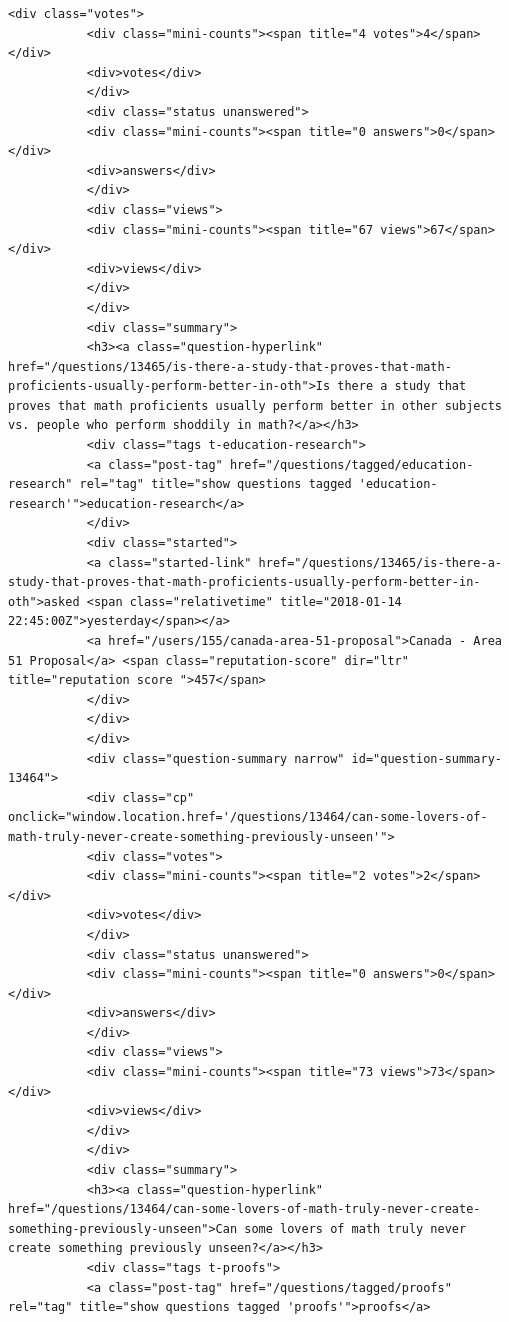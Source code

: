 \documentclass[11pt]{article}
\begin{document}
\begin{Verbatim}[commandchars=\\\{\}]
           <div class="votes">
           <div class="mini-counts"><span title="4 votes">4</span></div>
           <div>votes</div>
           </div>
           <div class="status unanswered">
           <div class="mini-counts"><span title="0 answers">0</span></div>
           <div>answers</div>
           </div>
           <div class="views">
           <div class="mini-counts"><span title="67 views">67</span></div>
           <div>views</div>
           </div>
           </div>
           <div class="summary">
           <h3><a class="question-hyperlink" href="/questions/13465/is-there-a-study-that-proves-that-math-proficients-usually-perform-better-in-oth">Is there a study that proves that math proficients usually perform better in other subjects vs. people who perform shoddily in math?</a></h3>
           <div class="tags t-education-research">
           <a class="post-tag" href="/questions/tagged/education-research" rel="tag" title="show questions tagged 'education-research'">education-research</a>
           </div>
           <div class="started">
           <a class="started-link" href="/questions/13465/is-there-a-study-that-proves-that-math-proficients-usually-perform-better-in-oth">asked <span class="relativetime" title="2018-01-14 22:45:00Z">yesterday</span></a>
           <a href="/users/155/canada-area-51-proposal">Canada - Area 51 Proposal</a> <span class="reputation-score" dir="ltr" title="reputation score ">457</span>
           </div>
           </div>
           </div>
           <div class="question-summary narrow" id="question-summary-13464">
           <div class="cp" onclick="window.location.href='/questions/13464/can-some-lovers-of-math-truly-never-create-something-previously-unseen'">
           <div class="votes">
           <div class="mini-counts"><span title="2 votes">2</span></div>
           <div>votes</div>
           </div>
           <div class="status unanswered">
           <div class="mini-counts"><span title="0 answers">0</span></div>
           <div>answers</div>
           </div>
           <div class="views">
           <div class="mini-counts"><span title="73 views">73</span></div>
           <div>views</div>
           </div>
           </div>
           <div class="summary">
           <h3><a class="question-hyperlink" href="/questions/13464/can-some-lovers-of-math-truly-never-create-something-previously-unseen">Can some lovers of math truly never create something previously unseen?</a></h3>
           <div class="tags t-proofs">
           <a class="post-tag" href="/questions/tagged/proofs" rel="tag" title="show questions tagged 'proofs'">proofs</a>

\end{Verbatim}
\end{document}
